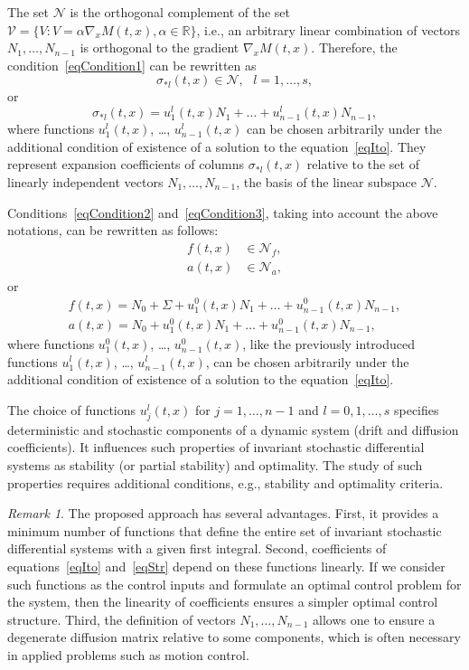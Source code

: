 \documentclass[10pt,reqno]{amsart}
\theoremstyle{plain}
\theoremstyle{remark}
\newtheorem{Remark}{Remark}
\begin{document}
The set $\mathcal{N}$ is the orthogonal complement of the set $\mathcal{V} = \{V \colon V = \alpha \nabla_x M(t,x), \alpha \in \mathds{R} \}$, i.e., an arbitrary linear combination of vectors $N_1,\dots,N_{n-1}$ is orthogonal to the gradient $\nabla_x M(t,x)$. Therefore, the condition~\eqref{eqCondition1} can be rewritten as
\begin{equation}\label{eqCondition1Geometry}
  \sigma_{*l}(t,x) \in \mathcal{N}, \ \ \ l = 1,\dots,s,
\end{equation}
or
\[
  \sigma_{*l}(t,x) = u_1^l(t,x) N_1 + \ldots + u_{n-1}^l(t,x) N_{n-1},
\]
where functions $u_1^l(t,x)$, \dots, $u_{n-1}^l(t,x)$ can be chosen arbitrarily under the additional condition of existence of a solution to the equation~\eqref{eqIto}. They represent expansion coefficients of columns $\sigma_{*l}(t,x)$ relative to the set of linearly independent vectors $N_1,\dots,N_{n-1}$, the basis of the linear subspace $\mathcal{N}$.

Conditions~\eqref{eqCondition2} and~\eqref{eqCondition3}, taking into account the above notations, can be rewritten as follows:
\begin{align}
  f(t,x) & \in \mathcal{N}_f, \label{eqCondition2Geometry} \\
  a(t,x) & \in \mathcal{N}_a, \label{eqCondition3Geometry}
\end{align}
or
\begin{gather*}
  f(t,x) = N_0 + \Sigma + u_1^0(t,x) N_1 + \ldots + u_{n-1}^0(t,x) N_{n-1}, \\
  a(t,x) = N_0 + u_1^0(t,x) N_1 + \ldots + u_{n-1}^0(t,x) N_{n-1},
\end{gather*}
where functions $u_1^0(t,x)$, \dots, $u_{n-1}^0(t,x)$, like the previously introduced functions $u_1^l(t,x)$, \dots, $u_{n-1}^l(t,x)$, can be chosen arbitrarily under the additional condition of existence of a solution to the equation~\eqref{eqIto}.

The choice of functions $u_j^l(t,x)$ for $j = 1,\dots,n-1$ and $l = 0,1,\dots,s$ specifies deterministic and stochastic components of a dynamic system (drift and diffusion coefficients). It influences such properties of invariant stochastic differential systems as stability (or partial stability) and optimality. The study of such properties requires additional conditions, e.g., stability and optimality criteria.

\begin{Remark}\label{rem3}
The proposed approach has several advantages. First, it provides a minimum number of functions that define the entire set of invariant stochastic differential systems with a given first integral. Second, coefficients of equations~\eqref{eqIto} and~\eqref{eqStr} depend on these functions linearly. If we consider such functions as the control inputs and formulate an optimal control problem for the system, then the linearity of coefficients ensures a simpler optimal control structure. Third, the definition of vectors $N_1,\dots,N_{n-1}$ allows one to ensure a degenerate diffusion matrix relative to some components, which is often necessary in applied problems such as motion control.
\end{Remark}
\end{document}
